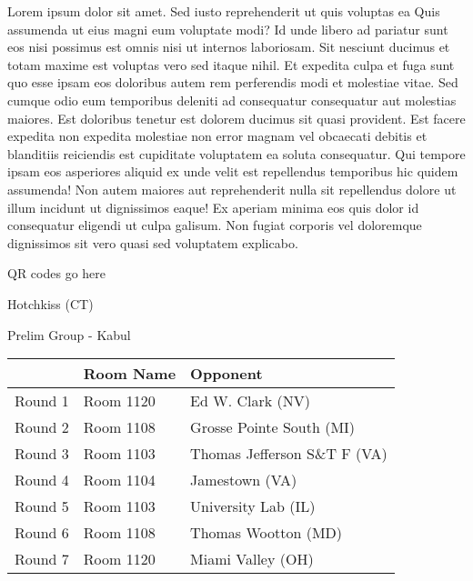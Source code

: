 \documentclass{article}%
\begin{document}
\vspace*{8pt}%
\linebreak%
\newline%
\newline%
Lorem ipsum dolor sit amet. Sed iusto reprehenderit ut quis voluptas ea Quis assumenda ut eius magni eum voluptate modi? Id unde libero ad pariatur sunt eos nisi possimus est omnis nisi ut internos laboriosam. Sit nesciunt ducimus et totam maxime est voluptas vero sed itaque nihil. Et expedita culpa et fuga sunt quo esse ipsam eos doloribus autem rem perferendis modi et molestiae vitae.\newline%
\newline%
Sed cumque odio eum temporibus deleniti ad consequatur consequatur aut molestias maiores. Est doloribus tenetur est dolorem ducimus sit quasi provident. Est facere expedita non expedita molestiae non error magnam vel obcaecati debitis et blanditiis reiciendis est cupiditate voluptatem ea soluta consequatur. Qui tempore ipsam eos asperiores aliquid ex unde velit est repellendus temporibus hic quidem assumenda!\newline%
\newline%
Non autem maiores aut reprehenderit nulla sit repellendus dolore ut illum incidunt ut dignissimos eaque! Ex aperiam minima eos quis dolor id consequatur eligendi ut culpa galisum. Non fugiat corporis vel doloremque dignissimos sit vero quasi sed voluptatem explicabo.\newline%
\newline%
%
\vspace*{30pt}%
\begin{center}%
\begin{Huge}%
QR codes go here%
\end{Huge}%
\end{center}%
\newpage%
%
\begin{center}%
\begin{Huge}%
Hotchkiss (CT)%
\end{Huge}%
\vspace*{8pt}%
\linebreak%
\begin{Large}%
Prelim Group {-} Kabul%
\end{Large}%
\end{center}%
\begin{tabularx}{\textwidth}{|c|Y|Y|}%
\hline%
&Room Name&Opponent\\%
\hline%
Round 1&Room 1120&Ed W. Clark (NV)\\%
Round 2&Room 1108&Grosse Pointe South (MI)\\%
Round 3&Room 1103&Thomas Jefferson S\&T F (VA)\\%
Round 4&Room 1104&Jamestown (VA)\\%
Round 5&Room 1103&University Lab (IL)\\%
Round 6&Room 1108&Thomas Wootton (MD)\\%
Round 7&Room 1120&Miami Valley (OH)\\%
\hline%
\end{tabularx}%
\end{document}
